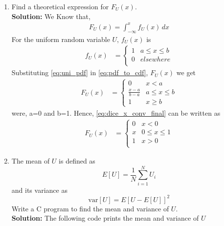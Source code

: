 \documentclass[journal,10pt,twocolumn]{IEEEtran}
\newcounter{Chapcounter}
\numberwithin{equation}{subsection}
\numberwithin{figure}{subsection}
\renewcommand\thesection{\theChapcounter.\arabic{section}}
\providecommand{\sbrak}[1]{\ensuremath{{}\left[#1\right]}}
\newcommand{\solution}{\noindent \textbf{Solution: }}
\renewcommand\thesection{\arabic{section}}
\renewcommand\thesubsection{\thesection.\arabic{subsection}}
\begin{document}
\begin{enumerate}[label=\thesubsection.\arabic*,ref=\thesubsection.\arabic{figure}]
\item
Find a  theoretical expression for $F_{U}(x)$.
\\
\solution
We Know that,
\begin{align} 
F_{U}(x) = \int_{-\infty}^{x} f_{U}(x)\,dx
\label{eq:pdf_to_cdf}
\end{align}
For the uniform random variable $U$, $f_{U}(x)$ is  
\begin{align}
	f_U(x) &= 
	\begin{cases}
	1 &  a \le x \le  b
	\\
	0 & elsewhere
	\\
	\end{cases}
	\label{eq:uni_pdf}
\end{align}
Substituting \eqref{eq:uni_pdf} in \eqref{eq:pdf_to_cdf}, $F_U(x)$ we get
\begin{align}
F_{U}(x) &= 
\begin{cases}
0 & x < a \\
\frac{x-a}{b-a} & a \leq x \leq b \\
1 & x \geq b
\end{cases}
\label{eq:dice_x_conv_final}
\end{align}
were, a=0 and b=1. Hence, \eqref{eq:dice_x_conv_final} can be written as
\begin{align}
	F_U(x) &= 
	\begin{cases}
	0 & x < 0
	\\	
	x & 0 \le x \le  1
	\\
	1 & x > 0
	\\
	\end{cases}
	\label{eq:uniform_cdf}
\end{align}

\item
\label{eq:print_uni}
The mean of $U$ is defined as
%
\begin{equation}
E\sbrak{U} = \frac{1}{N}\sum_{i=1}^{N}U_i
\end{equation}
%
and its variance as
%
\begin{equation}
\text{var}\sbrak{U} = E\sbrak{U- E\sbrak{U}}^2 
\end{equation}
Write a C program to  find the mean and variance of $U$. \\
\solution The following code prints the mean and variance of $U$\\
\
\\
\
\vspace{0.1cm}


\end{enumerate}
\end{document}
